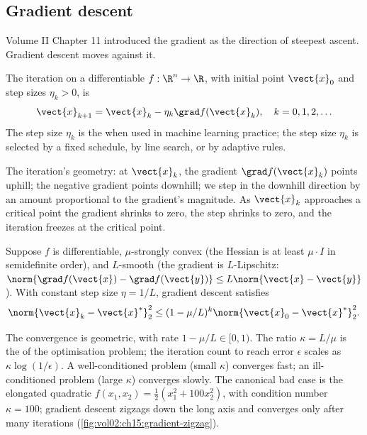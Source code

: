 \subsection{Gradient descent}

Volume II Chapter 11 introduced the gradient as the direction of
steepest ascent. Gradient descent moves against it.

\begin{definition}
The  iteration on a differentiable
$f : \R^{n} \to \R$, with initial point $\vect{x}_{0}$ and step
sizes $\eta_{k} > 0$, is
\[
\vect{x}_{k+1} = \vect{x}_{k} - \eta_{k} \grad f(\vect{x}_{k}),
\quad k = 0, 1, 2, \ldots
\]
The step size $\eta_{k}$ is the  when used
in machine learning practice; the step size $\eta_{k}$ is
selected by a fixed schedule, by line search, or by adaptive
rules.
\end{definition}

The iteration's geometry: at $\vect{x}_{k}$, the gradient
$\grad f(\vect{x}_{k})$ points uphill; the negative gradient
points downhill; we step in the downhill direction by an amount
proportional to the gradient's magnitude. As $\vect{x}_{k}$
approaches a critical point the gradient shrinks to zero, the
step shrinks to zero, and the iteration freezes at the critical
point.

\begin{theorem}
Suppose $f$ is differentiable, $\mu$-strongly convex (the Hessian
is at least $\mu \cdot I$ in semidefinite order), and $L$-smooth
(the gradient is $L$-Lipschitz: $\norm{\grad f(\vect{x}) - \grad
f(\vect{y})} \leq L \norm{\vect{x} - \vect{y}}$). With constant
step size $\eta = 1/L$, gradient descent satisfies
\[
\norm{\vect{x}_{k} - \vect{x}^{*}}_{2}^{2} \leq
(1 - \mu/L)^{k} \norm{\vect{x}_{0} - \vect{x}^{*}}_{2}^{2}.
\]
\end{theorem}

The convergence is geometric, with rate $1 - \mu/L \in [0, 1)$.
The ratio $\kappa = L/\mu$ is the  of
the optimisation problem; the iteration count to reach error
$\epsilon$ scales as $\kappa \log(1/\epsilon)$. A
well-conditioned problem (small $\kappa$) converges fast; an
ill-conditioned problem (large $\kappa$) converges slowly. The
canonical bad case is the elongated quadratic
$f(x_{1}, x_{2}) = \tfrac{1}{2}(x_{1}^{2} + 100 x_{2}^{2})$, with
condition number $\kappa = 100$; gradient descent zigzags down
the long axis and converges only after many iterations
(\cref{fig:vol02:ch15:gradient-zigzag}).

